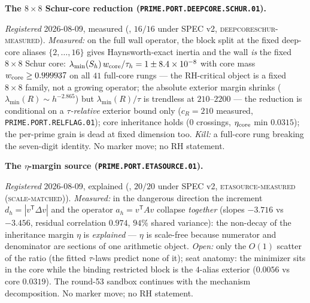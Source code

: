 \documentclass[11pt,a4paper]{article}
\begin{document}
\par\smallskip\noindent\textbf{The $8\times8$ Schur-core
reduction (\texttt{PRIME.PORT.DEEPCORE.\allowbreak SCHUR.01}).}
{\sloppy
\emph{Registered} 2026-08-09, measured
(, $16/16$ under SPEC v2,
\textsc{deepcoreschur-measured}).  \emph{Measured:} on the
full wall operator, the block split at the fixed deep-core
aliases $\{2, \dots, 16\}$ gives Haynsworth-exact inertia and
the wall \emph{is} the fixed $8\times8$ Schur core:
$\lambda_{\min}(S_h)\,w_{\rm core}/\tau_h = 1 \pm
8.4\times10^{-8}$ with core mass $w_{\rm core} \ge 0.999937$
on all $41$ full-core rungs --- the RH-critical object is a
fixed $8\times8$ family, not a growing operator; the absolute
exterior margin shrinks ($\lambda_{\min}(R) \sim h^{-2.865}$)
but $\lambda_{\min}(R)/\tau$ is trendless at $210$--$2200$ ---
the reduction is conditional on a \emph{$\tau$-relative}
exterior bound only ($c_R = 210$ measured,
\texttt{PRIME.PORT.RELFLAG.01}); core inheritance holds ($0$
crossings, $\eta_{\rm core}$ min $0.0315$); the per-prime
grain is dead at fixed dimension too.  \emph{Kill:} a
full-core rung breaking the seven-digit identity.  No marker
move; no RH statement.\par}

\par\smallskip\noindent\textbf{The $\eta$-margin source
(\texttt{PRIME.PORT.\allowbreak ETASOURCE.01}).}
{\sloppy
\emph{Registered} 2026-08-09, explained
(, $20/20$ under SPEC v2,
\textsc{etasource-measured (scale-matched)}).
\emph{Measured:} in the dangerous direction the increment
$d_h = |v^{\mathsf T}\Delta v|$ and the operator $a_h =
v^{\mathsf T}Av$ collapse \emph{together} (slopes $-3.716$ vs
$-3.456$, residual correlation $0.974$, $94\%$ shared
variance): the non-decay of the inheritance margin $\eta$ is
\emph{explained} --- $\eta$ is scale-free because numerator
and denominator are sections of one arithmetic object.
\emph{Open:} only the $O(1)$ scatter of the ratio (the fitted
$\tau$-laws predict none of it); seat anatomy: the minimizer
sits in the core while the binding restricted block is the
$4$-alias exterior ($0.0056$ vs core $0.0319$).  The round-53
sandbox continues with the mechanism decomposition.  No marker
move; no RH statement.\par}
\end{document}

